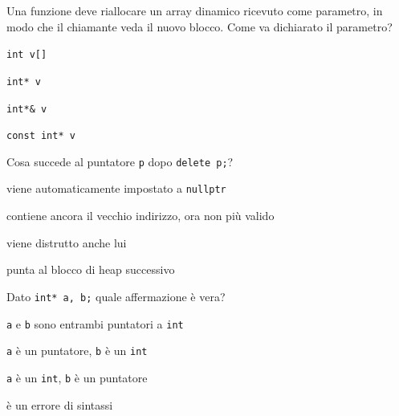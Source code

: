 \begin{quiz}{Una funzione deve riallocare un array dinamico ricevuto come parametro, in modo che il chiamante veda il nuovo blocco. Come va dichiarato il parametro?}
  \item \texttt{int v[]}
  \item \texttt{int* v}
  \item \texttt{int*\& v}
  \item \texttt{const int* v}
\end{quiz}

\begin{quiz}{Cosa succede al puntatore \texttt{p} dopo \texttt{delete p;}?}
  \item viene automaticamente impostato a \texttt{nullptr}
  \item contiene ancora il vecchio indirizzo, ora non più valido
  \item viene distrutto anche lui
  \item punta al blocco di heap successivo
\end{quiz}

\begin{quiz}{Dato \texttt{int* a, b;} quale affermazione è vera?}
  \item \texttt{a} e \texttt{b} sono entrambi puntatori a \texttt{int}
  \item \texttt{a} è un puntatore, \texttt{b} è un \texttt{int}
  \item \texttt{a} è un \texttt{int}, \texttt{b} è un puntatore
  \item è un errore di sintassi
\end{quiz}

